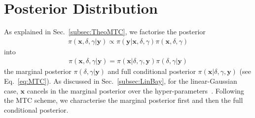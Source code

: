 \section{Posterior Distribution}
\label{sec:FirstO3Post}
As explained in Sec.~\ref{subsec:TheoMTC}, we factorise the posterior
\begin{align}
	\pi( \bm{x}, \delta, \gamma| \bm{y}) \propto \pi(\bm{y}| \bm{x},\delta,\gamma) \pi( \bm{x},  \delta,\gamma)
\end{align}
into 
\begin{align}
	\pi( \bm{x},  \delta,\gamma| \bm{y}) =\pi( \bm{x}| \delta,\gamma, \bm{y})\pi( \delta,\gamma | \bm{y})
\end{align}
the marginal posterior $\pi(\delta ,\gamma| \bm{y})$ and full conditional posterior $\pi( \bm{x}| \delta,\gamma, \bm{y})$ (see Eq.~\ref{eq:MTC}).
As discussed in Sec.~\ref{subsec:LinBay}, for the linear-Gaussian case, $\bm{x}$ cancels in the marginal posterior over the hyper-parameters~\cite{fox2016fast}.
Following the MTC scheme, we characterise the marginal posterior first and then the full conditional posterior.

